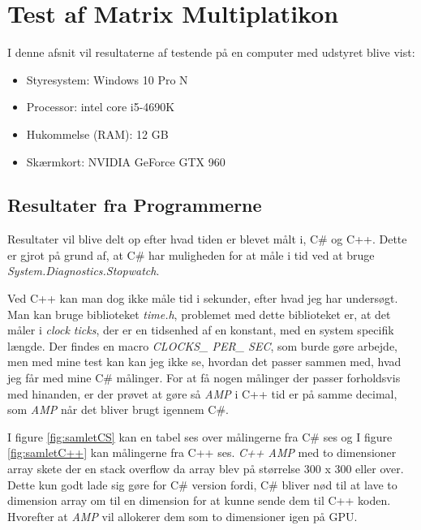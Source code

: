 \section{Test af Matrix Multiplatikon}
\label{Test_MM}
I denne afsnit vil resultaterne af testende på en computer med udstyret blive vist:
\begin{itemize}
\item Styresystem: Windows 10 Pro N
\item Processor: intel core i5-4690K
\item Hukommelse (RAM): 12 GB
\item Skærmkort: NVIDIA GeForce GTX 960
\end{itemize}

\subsection{Resultater fra Programmerne} \label{result_GPU_Funcalc}
Resultater vil blive delt op efter hvad tiden er blevet målt i, C\# og C++. Dette er gjrot på grund af, at C\# har muligheden for at måle i tid ved at bruge \textit{System.Diagnostics.Stopwatch}.

Ved C++ kan man dog ikke måle tid i sekunder, efter hvad jeg har undersøgt. Man kan bruge biblioteket \textit{time.h}, problemet med dette biblioteket er, at det måler i \textit{clock ticks}, der er en tidsenhed af en konstant, med en system specifik længde. Der findes en macro \textit{CLOCKS\_ PER\_ SEC}, som burde gøre arbejde, men med mine test kan kan jeg ikke se, hvordan det passer sammen med, hvad jeg får med mine C\# målinger. For at få nogen målinger der passer forholdsvis med hinanden, er der prøvet at gøre så \textit{AMP} i C++ tid er på samme decimal, som \textit{AMP} når det bliver brugt igennem C\#.
 
I figure \ref{fig:samletCS} kan en tabel ses over målingerne fra C\# ses og I figure \ref{fig:samletC++} kan målingerne fra C++ ses. \textit{C++ AMP} med to dimensioner array skete der en stack overflow da array blev på størrelse 300 x 300 eller over. Dette kun godt lade sig gøre for C\# version fordi, C\# bliver nød til at lave to dimension array om til en dimension for at kunne sende dem til C++ koden. Hvorefter at \textit{AMP} vil allokerer dem som to dimensioner igen på GPU.

